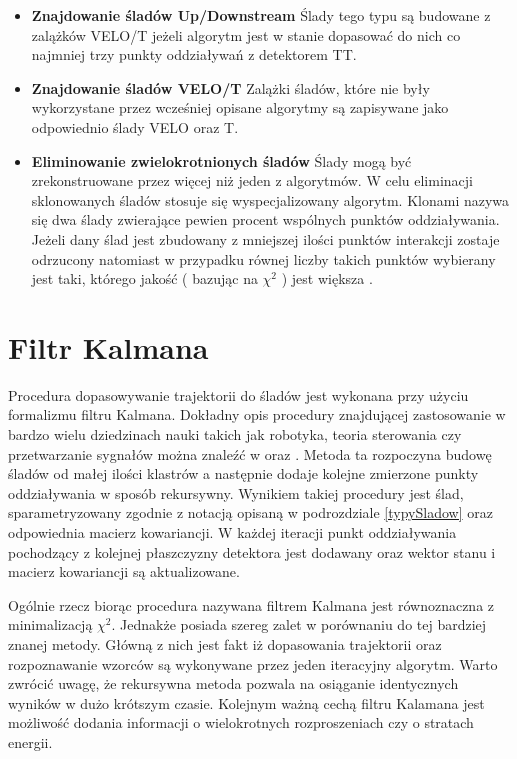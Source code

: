 \begin{itemize}
\item \textbf{Znajdowanie śladów Up/Downstream} Ślady tego typu są budowane z zalążków VELO/T jeżeli algorytm jest w stanie dopasować do nich co najmniej trzy punkty oddziaływań z detektorem TT. 
\item \textbf{Znajdowanie śladów VELO/T}  Zalążki śladów, które nie były wykorzystane przez wcześniej opisane algorytmy są zapisywane jako odpowiednio ślady VELO oraz T.
\item \textbf{Eliminowanie zwielokrotnionych śladów} Ślady mogą być zrekonstruowane przez więcej niż jeden z algorytmów. W celu eliminacji sklonowanych śladów  stosuje się wyspecjalizowany algorytm. Klonami nazywa się dwa ślady zwierające pewien procent wspólnych punktów oddziaływania. Jeżeli dany ślad jest zbudowany z mniejszej ilości punktów interakcji zostaje odrzucony natomiast w przypadku równej liczby takich punktów wybierany jest taki, którego jakość ( bazując na $\chi^2$ ) jest większa \cite{CloneTracks}. 
\end{itemize}
\section{Filtr Kalmana}
Procedura dopasowywanie trajektorii do śladów jest wykonana przy użyciu formalizmu filtru Kalmana. Dokładny opis procedury znajdującej zastosowanie w bardzo wielu dziedzinach nauki takich jak robotyka, teoria sterowania czy  przetwarzanie sygnałów można znaleźć w \cite{Kalman} oraz \cite{Kalman2}. Metoda ta rozpoczyna budowę śladów od małej ilości klastrów a następnie dodaje kolejne zmierzone punkty oddziaływania w sposób rekursywny. Wynikiem takiej procedury jest ślad, sparametryzowany zgodnie z notacją opisaną w podrozdziale \ref{typySladow} oraz odpowiednia macierz kowariancji. W każdej iteracji punkt oddziaływania pochodzący z kolejnej płaszczyzny detektora jest dodawany oraz wektor stanu i macierz kowariancji są aktualizowane. 

Ogólnie rzecz biorąc procedura nazywana filtrem Kalmana jest równoznaczna z minimalizacją $\chi^2$. Jednakże posiada szereg zalet w porównaniu do tej bardziej znanej metody. Główną z nich jest fakt iż dopasowania trajektorii oraz rozpoznawanie wzorców są wykonywane przez jeden iteracyjny algorytm. Warto zwrócić uwagę, że rekursywna metoda pozwala na osiąganie identycznych wyników w dużo krótszym czasie. Kolejnym ważną cechą filtru Kalamana jest możliwość dodania informacji o wielokrotnych rozproszeniach czy o stratach energii.   